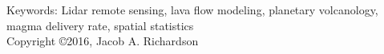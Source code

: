 \begin{titlepage}
\begin{center}
{ \vspace*{\baselineskip} }
{ \vspace*{\baselineskip} }
{ \vspace*{\baselineskip} }
Keywords: Lidar remote sensing, lava flow modeling, planetary volcanology, magma delivery rate, spatial statistics\\
{ \vspace*{\baselineskip} }
Copyright \copyright\hspace{1mm}2016, Jacob A. Richardson\\
\end{center}
\end{titlepage}
